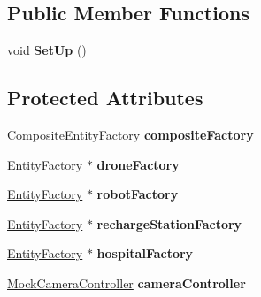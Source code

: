 \subsection*{Public Member Functions}
\begin{DoxyCompactItemize}
\item 
\mbox{\label{classCompositeEntityFactoryTest_a7d0f849fecea19edf9a3e3b597ce60d3}} 
void {\bfseries Set\+Up} ()
\end{DoxyCompactItemize}
\subsection*{Protected Attributes}
\begin{DoxyCompactItemize}
\item 
\mbox{\label{classCompositeEntityFactoryTest_a046f3577f6bf2717c1baf639b659267e}} 
\hyperlink{classCompositeEntityFactory}{Composite\+Entity\+Factory} {\bfseries composite\+Factory}
\item 
\mbox{\label{classCompositeEntityFactoryTest_ad460617e8b6f35b6e44e45c7ff8cad30}} 
\hyperlink{classEntityFactory}{Entity\+Factory} $\ast$ {\bfseries drone\+Factory}
\item 
\mbox{\label{classCompositeEntityFactoryTest_a22aa7484be110f1f96b9da9a3c18ea26}} 
\hyperlink{classEntityFactory}{Entity\+Factory} $\ast$ {\bfseries robot\+Factory}
\item 
\mbox{\label{classCompositeEntityFactoryTest_a5158cd15f3c18393d59a40fb9644c736}} 
\hyperlink{classEntityFactory}{Entity\+Factory} $\ast$ {\bfseries recharge\+Station\+Factory}
\item 
\mbox{\label{classCompositeEntityFactoryTest_a365112bbdf9a00f617a51ea3edebb0a8}} 
\hyperlink{classEntityFactory}{Entity\+Factory} $\ast$ {\bfseries hospital\+Factory}
\item 
\mbox{\label{classCompositeEntityFactoryTest_ac322ad6a2aad76460c60b0b5570aa264}} 
\hyperlink{classMockCameraController}{Mock\+Camera\+Controller} {\bfseries camera\+Controller}

\end{DoxyCompactItemize}
